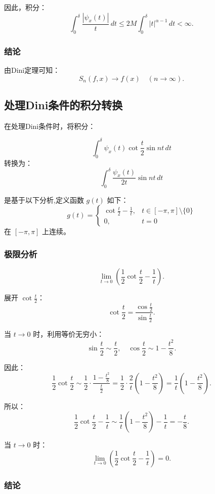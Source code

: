 \documentclass[12pt]{article}
\begin{document}
	因此，积分：
	\[
	\int_0^\delta \frac{|\psi_x(t)|}{t} \, dt \leq 2M \int_0^\delta |t|^{\alpha - 1} \, dt < \infty.
	\]
	
	\subsubsection{结论}
	
	由Dini定理可知：
	\[
	S_n(f, x) \to f(x) \quad (n \to \infty).
	\]
	

	\subsection{处理Dini条件的积分转换}
	
	在处理Dini条件时，将积分：

\[
\int_0^\delta \psi_x(t) \cot \frac{t}{2} \sin nt \, dt
\]
转换为：
\[
\int_0^\delta \frac{\psi_x(t)}{2t} \sin nt \, dt
\]
	
	是基于以下分析,定义函数 \( g(t) \) 如下：
	\[
	g(t) = 
	\begin{cases} 
		\cot \frac{t}{2} - \frac{1}{t}, & t \in [-\pi, \pi] \setminus \{0\} \\
		0, & t = 0
	\end{cases}
	\]
	在 \([- \pi, \pi]\) 上连续。
	
	\subsubsection{极限分析}
	

\[
\lim_{t \to 0} \left( \frac{1}{2} \cot \frac{t}{2} - \frac{1}{t} \right).
\]

展开 \(\cot \frac{t}{2}\)：
\[
\cot \frac{t}{2} = \frac{\cos \frac{t}{2}}{\sin \frac{t}{2}}.
\]

当 \( t \to 0 \) 时，利用等价无穷小：
\[
\sin \frac{t}{2} \sim \frac{t}{2}, \quad \cos \frac{t}{2} \sim 1 - \frac{t^2}{8}.
\]

因此：
\[
\frac{1}{2} \cot \frac{t}{2} \sim \frac{1}{2} \cdot \frac{1 - \frac{t^2}{8}}{\frac{t}{2}} = \frac{1}{2} \cdot \frac{2}{t} \left( 1 - \frac{t^2}{8} \right) = \frac{1}{t} \left( 1 - \frac{t^2}{8} \right).
\]

所以：
\[
\frac{1}{2} \cot \frac{t}{2} - \frac{1}{t} \sim \frac{1}{t} \left( 1 - \frac{t^2}{8} \right) - \frac{1}{t} = -\frac{t}{8}.
\]

当 \( t \to 0 \) 时：
\[
\lim_{t \to 0} \left( \frac{1}{2} \cot \frac{t}{2} - \frac{1}{t} \right) = 0.
\]

\subsubsection{结论}
\end{document}
